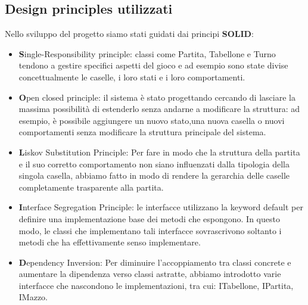 \documentclass{article}
\begin{document}
\subsection{Design principles utilizzati}
Nello sviluppo del progetto siamo stati guidati dai principi \textbf{SOLID}:
\begin{itemize}
    \item \textbf{S}ingle-Responsibility principle: classi come Partita, Tabellone e Turno tendono a gestire specifici aspetti del gioco e ad esempio sono state divise concettualmente le caselle, i loro stati e i loro comportamenti.
    
    \item \textbf{O}pen closed principle: il sistema è stato progettando cercando di lasciare la massima possibilità di estenderlo senza andarne a modificare la struttura: ad esempio, è possibile aggiungere un nuovo stato,una nuova casella o nuovi comportamenti senza modificare la struttura principale del sistema.
    
    \item \textbf{L}iskov Substitution Principle: Per fare in modo che la struttura della partita e il suo corretto comportamento non siano influenzati dalla tipologia della singola casella, abbiamo fatto in modo di rendere la gerarchia delle caselle completamente trasparente alla partita.
    
    \item \textbf{I}nterface Segregation Principle: le interfacce utilizzano la keyword default per definire una implementazione base dei metodi che espongono. In questo modo, le classi che implementano tali interfacce sovrascrivono soltanto i metodi che ha effettivamente senso implementare.
    
    \item \textbf{D}ependency Inversion: Per diminuire l'accoppiamento tra classi concrete e aumentare la dipendenza verso classi astratte, abbiamo introdotto varie interfacce che nascondono le implementazioni, tra cui: ITabellone, IPartita, IMazzo.
    \end{itemize}
\end{document}
